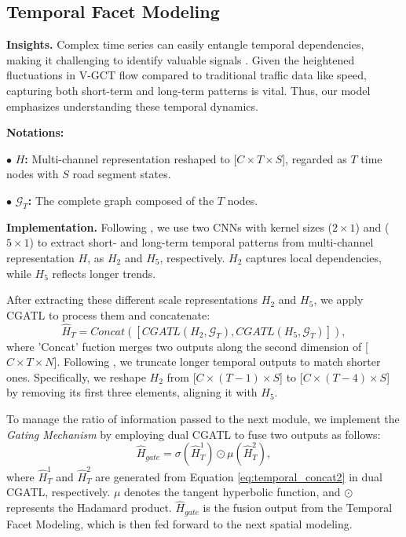 \documentclass[letterpaper]{article} %
\begin{document}
\subsection{Temporal Facet Modeling}
\noindent \textbf{Insights.}
Complex time series can easily entangle temporal dependencies, making it challenging to identify valuable signals \cite{xu2017real, ye2022learning}. Given the heightened fluctuations in V-GCT flow compared to traditional traffic data like speed, capturing both short-term and long-term patterns is vital. Thus, our model emphasizes understanding these temporal dynamics.

\noindent \textbf{Notations:}

$\bullet$ \textbf{$H$:} Multi-channel representation reshaped to [$C \times T \times S$], regarded as $T$ time nodes with $S$ road segment states.

$\bullet$ \textbf{$\mathcal{G}_{T}$:} The complete graph composed of the $T$ nodes.

\noindent \textbf{Implementation.}
Following \cite{wu2020connecting, ye2022learning}, we use two CNNs with kernel sizes ($2 \times 1$) and ($5 \times 1$) to extract short- and long-term temporal patterns from multi-channel representation $H$, as $H_{2}$ and $H_{5}$, respectively. $H_{2}$ captures local dependencies, while $H_{5}$ reflects longer trends.

After extracting these different scale representations $H_{2}$ and $H_{5}$, we apply CGATL to process them and concatenate:
\begin{equation}
\hat{H}_{T} = Concat([CGATL(H_{2},\mathcal{G}_{T}),CGATL(H_{5},\mathcal{G}_{T})]),
\label{eq:temporal_concat2}
\end{equation}
where 'Concat' fuction merges two outputs along the second dimension of [$C \times T \times N$]. Following \cite{wu2020connecting}, we truncate longer temporal outputs to match shorter ones. Specifically, we reshape $H_{2}$ from [$C \times (T-1) \times S$] to [$C \times (T-4) \times S$] by removing its first three elements, aligning it with $H_{5}$.

To manage the ratio of information passed to the next module, we implement the \textit{Gating Mechanism} \cite{wu2019graph, ye2022learning} by employing dual CGATL to fuse two outputs as follows:
\begin{equation}
\hat{H}_{gate} = \sigma(\hat{H}^{1}_{T}) \odot \mu(\hat{H}^{2}_{T}),
\end{equation}
where $\hat{H}^{1}_{T}$ and $\hat{H}^{2}_{T}$ are generated from Equation \ref{eq:temporal_concat2} in dual CGATL, respectively. $\mu$ denotes the tangent hyperbolic function, and $\odot$ represents the Hadamard product. $\hat{H}_{gate}$ is the fusion output from the Temporal Facet Modeling, which is then fed forward to the next spatial modeling.
\end{document}
